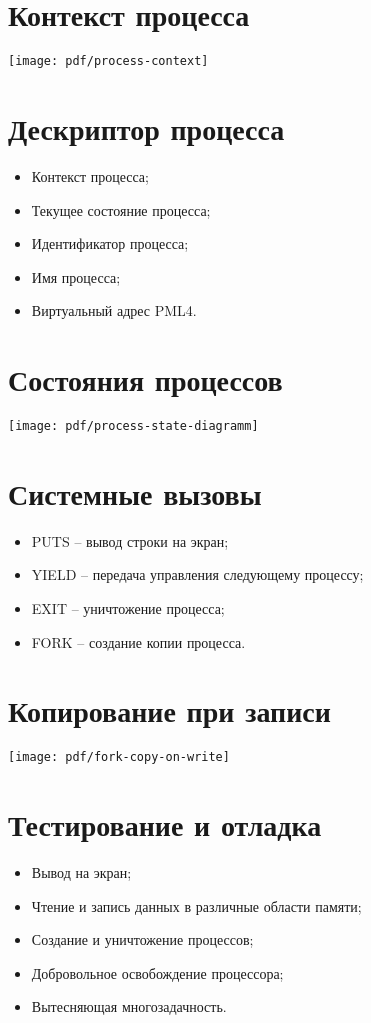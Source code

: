 \documentclass[12pt]{article}
\begin{document}
\section{\textbf{Контекст процесса}}
\begin{center}
\texttt{[image: pdf/process-context]}
\end{center}


\section{\textbf{Дескриптор процесса}}
\begin{itemize}
\item Контекст процесса;
\item Текущее состояние процесса;
\item Идентификатор процесса;
\item Имя процесса;
\item Виртуальный адрес PML4.
\end{itemize}


\section{\textbf{Состояния процессов}}
\begin{center}
\texttt{[image: pdf/process-state-diagramm]}
\end{center}


\section{\textbf{Системные вызовы}}
\begin{itemize}
\item PUTS -- вывод строки на экран;
\item YIELD -- передача управления следующему процессу;
\item EXIT -- уничтожение процесса;
\item FORK -- создание копии процесса.
\end{itemize}


\section{\textbf{Копирование при записи}}
\texttt{[image: pdf/fork-copy-on-write]}


\section{\textbf{Тестирование и отладка}}
\begin{itemize}
\item Вывод на экран;
\item Чтение и запись данных в различные области памяти;
\item Создание и уничтожение процессов;
\item Добровольное освобождение процессора;
\item Вытесняющая многозадачность.
\end{itemize}
\end{document}
